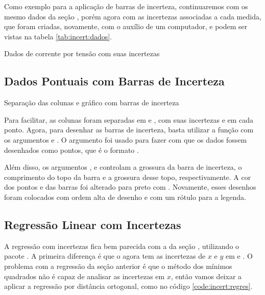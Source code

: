 Como exemplo para a aplicação de barras de incerteza, continuaremos com os mesmo dados da seção , porém agora com as incertezas associadas a cada medida, que foram criadas, novamente, com o auxílio de um computador, e podem ser vistas na tabela \ref{tab:incert:dados}.

\begin{table}[H]
    \centering
    
    \caption{Dados de corrente por tensão com suas incertezas}
    \label{tab:incert:dados}
\end{table}


\subsection{Dados Pontuais com Barras de Incerteza}

    \begin{listing}[H]
        \caption{Separação das colunas e gráfico com barras de incerteza}
        \label{code:incert:dados}

    \end{listing}

    Para facilitar, as colunas foram separadas em  e , com suas incertezas  e  em cada ponto. Agora, para desenhar as barras de incerteza, basta utilizar a função  com os argumentos  e . O argumento  foi usado para fazer com que os dados fossem desenhados como pontos, que é o formato .

    Além disso, os argumentos ,  e  controlam a grossura da barra de incerteza, o comprimento do topo da barra e a grossura desse topo, respectivamente. A cor dos pontos e das barras foi alterado para preto com . Novamente, esses desenhos foram colocados com ordem alta de desenho e com um rótulo para a legenda.


\subsection{Regressão Linear com Incertezas}

    A regressão com incertezas fica bem parecida com a da seção , utilizando o pacote . A primeira diferença é que o  agora tem as incertezas de $x$ e $y$ em  e . O problema com a regressão da seção anterior é que o método dos mínimos quadrados não é capaz de analisar as incertezas em $x$, então vamos deixar a  aplicar a regressão por distância ortogonal, como no código \ref{code:incert:regres}.

